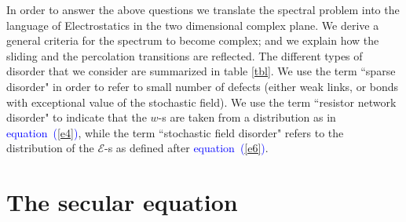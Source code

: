 \documentclass[aps,pre,floats,floatfix,twocolumn]{revtex4}
\newcommand{\Eq}[1]{\textcolor{blue}{{equation}\!~(\ref{#1})}}
\begin{document}
In order to answer the above questions we translate the spectral problem 
into the language of Electrostatics in the two dimensional complex plane. 
We derive a general criteria for the spectrum to become complex; 
and we explain how the sliding and the percolation transitions are reflected. 
The different types of disorder that we consider are summarized in table \ref{tbl}.
We use the term ``sparse disorder" in order to refer to small number of 
defects (either weak links, or bonds with exceptional value of the stochastic field).
We use the term ``resistor network  disorder" to indicate that the $w$-s are taken 
from a distribution as in \Eq{e4}, while the term ``stochastic field disorder" 
refers to the distribution of the $\mathcal{E}$-s as defined after \Eq{e6}.



\section{The secular equation}
\end{document}
